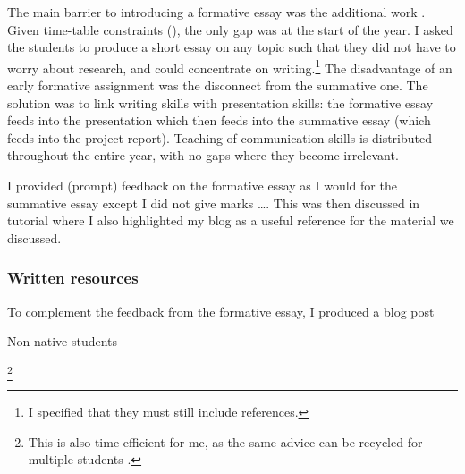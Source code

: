 The main barrier to introducing a formative essay was the additional work \citep[chapter 4]{Irons2008}. Given time-table constraints (), the only gap was at the start of the year. I asked the students to produce a short essay on any topic such that they did not have to worry about research, and could concentrate on writing.\footnote{I specified that they must still include references.} The disadvantage of an early formative assignment was the disconnect from the summative one. The solution was to link writing skills with presentation skills: the formative essay feeds into the presentation which then feeds into the summative essay (which feeds into the project report). Teaching of communication skills is distributed throughout the entire year, with no gaps where they become irrelevant.

I provided (prompt) feedback on the formative essay as I would for the summative essay except I did not give marks \ldots. This was then discussed in tutorial where I also highlighted my blog as a useful reference for the material we discussed.

\subsubsection{Written resources}\label{sec:blog}

To complement the feedback from the formative essay, I produced a blog post 

Non-native students \citep{Rainsbury2003}

\footnote{This is also time-efficient for me, as the same advice can be recycled for multiple students \citep[chapter 4]{Irons2008}.}
